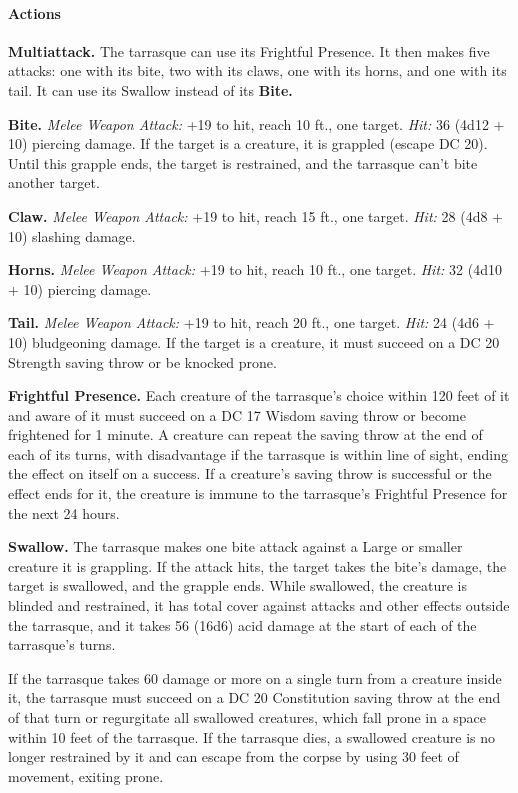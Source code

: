 \documentclass[
]{article}
\begin{document}
\hypertarget{actions}{%
\paragraph{Actions}\label{actions}}

\textbf{Multiattack.} The tarrasque can use its Frightful Presence. It
then makes five attacks: one with its bite, two with its claws, one with
its horns, and one with its tail. It can use its Swallow instead of its
\textbf{Bite.}

\textbf{Bite.} \emph{Melee Weapon Attack:} +19 to hit, reach 10 ft., one
target. \emph{Hit:} 36 (4d12 + 10) piercing damage. If the target is a
creature, it is grappled (escape DC 20). Until this grapple ends, the
target is restrained, and the tarrasque can't bite another target.

\textbf{Claw.} \emph{Melee Weapon Attack:} +19 to hit, reach 15 ft., one
target. \emph{Hit:} 28 (4d8 + 10) slashing damage.

\textbf{Horns.} \emph{Melee Weapon Attack:} +19 to hit, reach 10 ft.,
one target. \emph{Hit:} 32 (4d10 + 10) piercing damage.

\textbf{Tail.} \emph{Melee Weapon Attack:} +19 to hit, reach 20 ft., one
target. \emph{Hit:} 24 (4d6 + 10) bludgeoning damage. If the target is a
creature, it must succeed on a DC 20 Strength saving throw or be knocked
prone.

\textbf{Frightful Presence.} Each creature of the tarrasque's choice
within 120 feet of it and aware of it must succeed on a DC 17 Wisdom
saving throw or become frightened for 1 minute. A creature can repeat
the saving throw at the end of each of its turns, with disadvantage if
the tarrasque is within line of sight, ending the effect on itself on a
success. If a creature's saving throw is successful or the effect ends
for it, the creature is immune to the tarrasque's Frightful Presence for
the next 24 hours.

\textbf{Swallow.} The tarrasque makes one bite attack against a Large or
smaller creature it is grappling. If the attack hits, the target takes
the bite's damage, the target is swallowed, and the grapple ends. While
swallowed, the creature is blinded and restrained, it has total cover
against attacks and other effects outside the tarrasque, and it takes 56
(16d6) acid damage at the start of each of the tarrasque's turns.

If the tarrasque takes 60 damage or more on a single turn from a
creature inside it, the tarrasque must succeed on a DC 20 Constitution
saving throw at the end of that turn or regurgitate all swallowed
creatures, which fall prone in a space within 10 feet of the tarrasque.
If the tarrasque dies, a swallowed creature is no longer restrained by
it and can escape from the corpse by using 30 feet of movement, exiting
prone.
\end{document}
